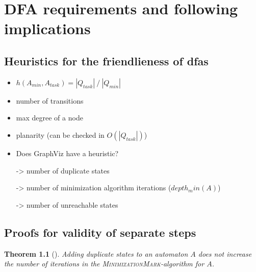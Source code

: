 \documentclass[a4paper, oneside, 11pt]{report}
\newtheorem{theorem}{Theorem}
\theoremstyle{definition}
\theoremstyle{remark}
\newcommand{\MinMark}{\textsc{MinimizationMark}}
\begin{document}
\chapter{DFA requirements and following implications}

\section{Heuristics for the friendlieness of dfas}

\begin{itemize}
	\item $h(A_{min}, A_{task}) = |Q_{task}|\ /\ |Q_{min}|$
	\item number of transitions
	\item max degree of a node
	\item planarity (can be checked in $O(|Q_{task}|)$)
	\item Does GraphViz have a heuristic?
	\item[->] number of duplicate states
	\item[->] number of minimization algorithm iterations ($depth_min(A)$)
	\item[->] number of unreachable states
\end{itemize}

\section{Proofs for validity of separate steps}

\begin{theorem}[]
	Adding duplicate states to an automaton $A$ does not increase the number of iterations in the \MinMark-algorithm for $A$.
\end{theorem}
\end{document}
